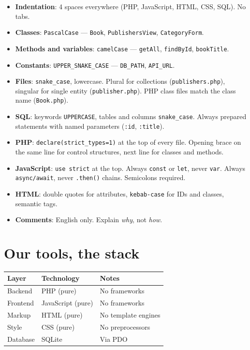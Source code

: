 \documentclass[11pt,a4paper,oneside]{book}
\providecommand{\tightlist}{%
  \setlength{\itemsep}{0pt}\setlength{\parskip}{0pt}}
\begin{document}
\begin{itemize}
\tightlist
\item
  \textbf{Indentation}: 4 spaces everywhere (PHP, JavaScript,
  HTML, CSS, SQL). No tabs.
\item
  \textbf{Classes}: \texttt{PascalCase} --- \texttt{Book},
  \texttt{PublishersView}, \texttt{CategoryForm}.
\item
  \textbf{Methods and variables}: \texttt{camelCase} ---
  \texttt{getAll}, \texttt{findById}, \texttt{bookTitle}.
\item
  \textbf{Constants}: \texttt{UPPER\_SNAKE\_CASE} ---
  \texttt{DB\_PATH}, \texttt{API\_URL}.
\item
  \textbf{Files}: \texttt{snake\_case}, lowercase. Plural for
  collections (\texttt{publishers.php}), singular for single
  entity (\texttt{publisher.php}). PHP class files match the
  class name (\texttt{Book.php}).
\item
  \textbf{SQL}: keywords \texttt{UPPERCASE}, tables and columns
  \texttt{snake\_case}. Always prepared statements with named
  parameters (\texttt{:id}, \texttt{:title}).
\item
  \textbf{PHP}: \texttt{declare(strict\_types=1)} at the top of
  every file. Opening brace on the same line for control
  structures, next line for classes and methods.
\item
  \textbf{JavaScript}:
  \texttt{\textquotesingle{}use\ strict\textquotesingle{}} at the
  top. Always \texttt{const} or \texttt{let}, never \texttt{var}.
  Always \texttt{async/await}, never \texttt{.then()} chains.
  Semicolons required.
\item
  \textbf{HTML}: double quotes for attributes,
  \texttt{kebab-case} for IDs and classes, semantic tags.
\item
  \textbf{Comments}: English only. Explain \emph{why}, not
  \emph{how}.
\end{itemize}

\hypertarget{our-tools-the-stack}{%
\section{Our tools, the stack}\label{our-tools-the-stack}}

\begin{longtable}[]{@{}lll@{}}
\toprule
Layer & Technology & Notes \\
\midrule
\endhead
Backend & PHP (pure) & No frameworks \\
Frontend & JavaScript (pure) & No frameworks \\
Markup & HTML (pure) & No template engines \\
Style & CSS (pure) & No preprocessors \\
Database & SQLite & Via PDO \\
\bottomrule
\end{longtable}
\end{document}
